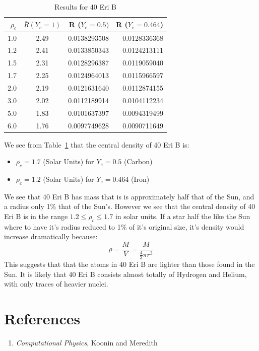 \documentclass[a4paper]{IEEEtran}
\newcommand{\showcode}[1]{\begin{mdframed}[style=code] %
                          \end{mdframed}%
}
\begin{document}
    \begin{table}
        \caption{Results for 40 Eri B} 
        \label{tbl:results-40-eri-b} 
        \begin{center}
            \begin{tabular}{r|crr} \hline
            $\rho_c$    &   $\bar{R}(Y_e=1)$   & R ($Y_e = 0.5)$   & R ($Y_e = 0.464$)\\ \hline
            1.0         &   2.49        & 0.0138293508      & 0.0128336368 \\
            1.2         &   2.41        & 0.0133850343      & 0.0124213111 \\
            1.5         &   2.31        & 0.0128296387      & 0.0119059040 \\
            1.7         &   2.25        & 0.0124964013      & 0.0115966597 \\
            2.0         &   2.19        & 0.0121631640       & 0.0112874155 \\
            3.0         &   2.02        & 0.0112189914      & 0.0104112234 \\
            5.0         &   1.83        & 0.0101637397      & 0.0094319499 \\
            6.0         &   1.76        & 0.0097749628     & 0.0090711649 \\ \hline
            \end{tabular}
        \end{center}
    \end{table} 

    We see from Table~\ref{tbl:results-40-eri-b} that the central density of 40 Eri B is:
    \begin{itemize}
        \item $\rho_c = 1.7$ (Solar Units) for $Y_e = 0.5$ (Carbon)
        \item $\rho_c = 1.2$ (Solar Units) for $Y_e = 0.464$ (Iron)
    \end{itemize}

    We see that 40 Eri B has mass that is is approximately half that of
    the Sun, and a radius only 1\% that of the Sun's. However we see that
    the central density of 40 Eri B is in the range $1.2 \leq \rho_c \leq 1.7$
    in solar units. If a star half the like the Sun where to have it's radius 
    reduced to 1\% of it's original size, it's density would increase
    dramatically because:
        \[ \rho = \frac{M}{V} = \frac{M}{\frac{4}{3} \pi r^3} \]
    This suggests that that the atoms in 40 Eri B are lighter than those
    found in the Sun. It is likely that 40 Eri B consists almost totally
    of Hydrogen and Helium, with only traces of heavier nuclei.

    \section{References}
        \begin{enumerate}
            \item \emph{Computational Physics}, Koonin and Meredith
        \end{enumerate} 



    \onecolumn
    \showcode{src/star.f} 
\end{document}
